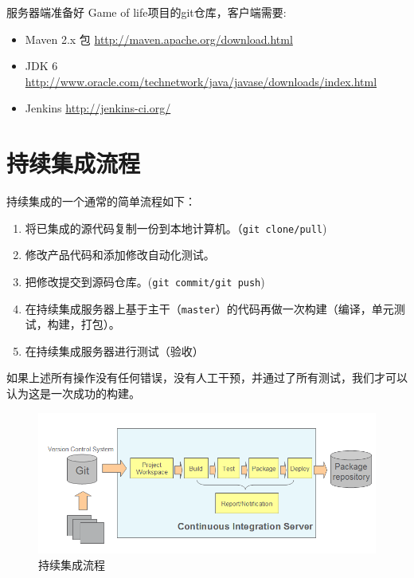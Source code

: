 服务器端准备好 Game of life项目的git仓库，客户端需要:

\begin{itemize}
\item Maven 2.x 包 \href{http://maven.apache.org/download.html}{http:/\slash maven.apache.org\slash download.html}

\item JDK 6 \href{http://www.oracle.com/technetwork/java/javase/downloads/index.html}{http:/\slash www.oracle.com\slash technetwork\slash java\slash javase\slash downloads\slash index.html}

\item Jenkins \href{http://jenkins-ci.org/}{http:/\slash jenkins-ci.org\slash }

\end{itemize}

\section{持续集成流程}
\label{持续集成流程}

持续集成的一个通常的简单流程如下：

\begin{enumerate}
\item 将已集成的源代码复制一份到本地计算机。（\texttt{git clone\slash pull})

\item 修改产品代码和添加修改自动化测试。

\item 把修改提交到源码仓库。(\texttt{git commit\slash git push})

\item 在持续集成服务器上基于主干（\texttt{master}）的代码再做一次构建（编译，单元测试，构建，打包）。

\item 在持续集成服务器进行测试（验收）

\end{enumerate}

如果上述所有操作没有任何错误，没有人工干预，并通过了所有测试，我们才可以认为这是一次成功的构建。

\begin{figure}[htbp]
\centering
\includegraphics[keepaspectratio,width=\textwidth,height=0.75\textheight]{img/18333fig0301-tn.png}
\caption{持续集成流程}
\end{figure}

